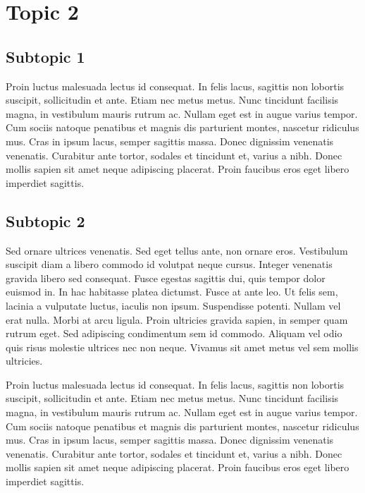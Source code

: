 \section{Topic 2}
\subsection{Subtopic 1}
Proin luctus malesuada lectus id consequat. In felis lacus, sagittis non lobortis suscipit, sollicitudin et ante. Etiam nec metus metus. Nunc tincidunt facilisis magna, in vestibulum mauris rutrum ac. Nullam eget est in augue varius tempor. Cum sociis natoque penatibus et magnis dis parturient montes, nascetur ridiculus mus. Cras in ipsum lacus, semper sagittis massa. Donec dignissim venenatis venenatis. Curabitur ante tortor, sodales et tincidunt et, varius a nibh. Donec mollis sapien sit amet neque adipiscing placerat. Proin faucibus eros eget libero imperdiet sagittis.

\subsection{Subtopic 2}
Sed ornare ultrices venenatis. Sed eget tellus ante, non ornare eros. Vestibulum suscipit diam a libero commodo id volutpat neque cursus. Integer venenatis gravida libero sed consequat. Fusce egestas sagittis dui, quis tempor dolor euismod in. In hac habitasse platea dictumst. Fusce at ante leo. Ut felis sem, lacinia a vulputate luctus, iaculis non ipsum. Suspendisse potenti. Nullam vel erat nulla. Morbi at arcu ligula. Proin ultricies gravida sapien, in semper quam rutrum eget. Sed adipiscing condimentum sem id commodo. Aliquam vel odio quis risus molestie ultrices nec non neque. Vivamus sit amet metus vel sem mollis ultricies.

Proin luctus malesuada lectus id consequat. In felis lacus, sagittis non lobortis suscipit, sollicitudin et ante. Etiam nec metus metus. Nunc tincidunt         facilisis magna, in vestibulum mauris rutrum ac. Nullam eget est in augue varius tempor. Cum sociis natoque penatibus et magnis dis parturient montes, nascetur ridiculus mus. Cras in ipsum lacus, semper sagittis massa. Donec dignissim venenatis venenatis. Curabitur ante tortor, sodales et tincidunt et, varius a nibh.  Donec mollis sapien sit amet neque adipiscing placerat. Proin faucibus eros eget libero imperdiet sagittis.


